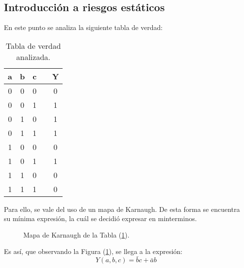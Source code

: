 



\subsection{Introducción a riesgos estáticos}
En este punto se analiza la siguiente tabla de verdad:
\begin{table}[H]
\centering
\begin{tabular}{ccccc}
\hline
\textbf{a} & \textbf{b} & \textbf{c} &  & \textbf{Y} \\
\hline
0          & 0          & 0          &  & 0         \\
0          & 0          & 1          &  & 1         \\
0          & 1          & 0          &  & 1         \\
0          & 1          & 1          &  & 1         \\
1          & 0          & 0          &  & 0         \\
1          & 0          & 1          &  & 1         \\
1          & 1          & 0          &  & 0         \\
1          & 1          & 1          &  & 0         \\
\hline
\end{tabular}
\caption{Tabla de verdad analizada.}
\label{tabla:verdad}
\end{table}

Para ello, se vale del uso de un mapa de Karnaugh. De esta forma se encuentra su mínima expresión, la cuál se decidió expresar en minterminos.

\begin{figure}[H]
\begin{centering}
    \begin{Karnaughvuit}
        
    \end{Karnaughvuit}
\par\end{centering}
\centering
\caption{Mapa de Karnaugh de la Tabla (\ref{tabla:verdad}).}
\label{fig:karsinc}
\end{figure}

Es así, que observando la Figura (\ref{fig:karsinc}), se llega a la expresión:
\begin{equation}
	Y \left( a,b,c \right) = \bar{b} c + \bar{a} b
	\label{equ:karsinc}
\end{equation}

